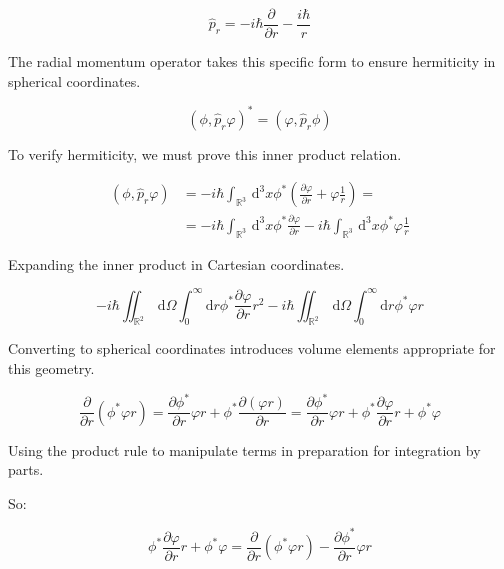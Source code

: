 \begin{equation}
\hat{p}_{r}=-i \hbar \frac{\partial}{\partial r}-\frac{i \hbar}{r}
\end{equation}

The radial momentum operator takes this specific form to ensure hermiticity in spherical coordinates.

\begin{equation}
\left(\phi, \hat{p}_{r} \varphi\right)^{*}=\left(\varphi, \hat{p}_{r} \phi\right)
\end{equation}

To verify hermiticity, we must prove this inner product relation.

\begin{align}
\left(\phi, \hat{p}_{r} \varphi\right) & =-i \hbar \int_{\mathbb{R}^{3}} \, \mathrm{d}^{3} x \phi^{*}\left(\frac{\partial \varphi}{\partial r}+\varphi \frac{1}{r}\right)=  \\
& =-i \hbar \int_{\mathbb{R}^{3}} \, \mathrm{d}^{3} x \phi^{*} \frac{\partial \varphi}{\partial r}-i \hbar \int_{\mathbb{R}^{3}} \, \mathrm{d}^{3} x \phi^{*} \varphi \frac{1}{r}
\end{align}

Expanding the inner product in Cartesian coordinates.

\begin{equation}
-i \hbar \iint_{\mathbb{R}^{2}} \, \mathrm{d} \Omega \int_{0}^{\infty} \mathrm{d} r \phi^{*} \frac{\partial \varphi}{\partial r} r^{2}-i \hbar \iint_{\mathbb{R}^{2}} \, \mathrm{d} \Omega \int_{0}^{\infty} \mathrm{d} r \phi^{*} \varphi r
\end{equation}

Converting to spherical coordinates introduces volume elements appropriate for this geometry.

\begin{equation}
\frac{\partial}{\partial r}\left(\phi^{*} \varphi r\right)=\frac{\partial \phi^{*}}{\partial r} \varphi r+\phi^{*} \frac{\partial(\varphi r)}{\partial r}=\frac{\partial \phi^{*}}{\partial r} \varphi r+\phi^{*} \frac{\partial \varphi}{\partial r} r+\phi^{*} \varphi
\end{equation}

Using the product rule to manipulate terms in preparation for integration by parts.

So:

\begin{equation}
\phi^{*} \frac{\partial \varphi}{\partial r} r+\phi^{*} \varphi=\frac{\partial}{\partial r}\left(\phi^{*} \varphi r\right)-\frac{\partial \phi^{*}}{\partial r} \varphi r
\end{equation}

